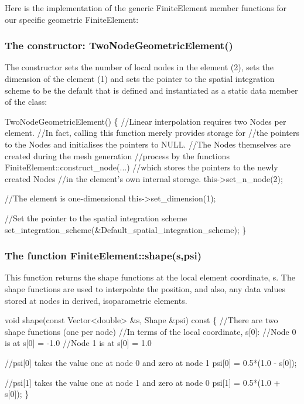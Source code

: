 Here is the implementation of the generic {\ttfamily Finite\+Element} member functions for our specific geometric {\ttfamily Finite\+Element\+:} \hypertarget{index_Geomconst}{}\subsubsection{The constructor\+: Two\+Node\+Geometric\+Element()}\label{index_Geomconst}
The constructor sets the number of local nodes in the element (2), sets the dimension of the element (1) and sets the pointer to the spatial integration scheme to be the default that is defined and instantiated as a static data member of the class\+: 
\begin{DoxyCodeInclude}
 TwoNodeGeometricElement()
  \{
   \textcolor{comment}{//Linear interpolation requires two Nodes per element.}
   \textcolor{comment}{//In fact, calling this function merely provides storage for }
   \textcolor{comment}{//the pointers to the Nodes and initialises the pointers to NULL. }
   \textcolor{comment}{//The Nodes themselves are created during the mesh generation }
   \textcolor{comment}{//process by the functions FiniteElement::construct\_node(...) }
   \textcolor{comment}{//which stores the pointers to the newly created Nodes }
   \textcolor{comment}{//in the element's own internal storage.}
   this->set\_n\_node(2);

   \textcolor{comment}{//The element is one-dimensional }
   this->set\_dimension(1);

   \textcolor{comment}{//Set the pointer to the spatial integration scheme}
   set\_integration\_scheme(&Default\_spatial\_integration\_scheme);
  \}

\end{DoxyCodeInclude}
\hypertarget{index_shape}{}\subsubsection{The function Finite\+Element\+::shape(s,psi)}\label{index_shape}
This function returns the shape functions at the local element coordinate, s. The shape functions are used to interpolate the position, and also, any data values stored at nodes in derived, isoparametric elements. 
\begin{DoxyCodeInclude}
 \textcolor{keywordtype}{void} shape(\textcolor{keyword}{const} Vector<double> &s, Shape &psi) \textcolor{keyword}{const}
  \{
   \textcolor{comment}{//There are two shape functions (one per node)}
   \textcolor{comment}{//In terms of the local coordinate, s[0]:}
   \textcolor{comment}{//Node 0 is at s[0] = -1.0}
   \textcolor{comment}{//Node 1 is at s[0] =  1.0}
   
   \textcolor{comment}{//psi[0] takes the value one at node 0 and zero at node 1}
   psi[0] = 0.5*(1.0 - s[0]);

   \textcolor{comment}{//psi[1] takes the value one at node 1 and zero at node 0}
   psi[1] = 0.5*(1.0 + s[0]);
  \}

\end{DoxyCodeInclude}
